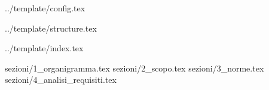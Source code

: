  {../template/config.tex}


\def\DOCUMENTO{Relazione}
\def\VERSIONE{1.0.0}

\def\DESCRIZIONE{<Info documento>}

\def\REDATTORE {Francesco Bizzaro\\ & Gino Zaidan}
\def\VERIFICATORE {Luca Finotello\\ & Stefano Scaglione}
\def\RESPONSABILE {Bizzaro Francesco}

\def\USO {Interno}

\def\DISTRIBUZIONE {\GRUPPO{}\\ & \COMMITTENTE{}\\}

\def\DESCRIZIONE {Relazione del progetto \textit{\PROGETTO}, realizzato per il corso di \textit{tecnologie web} dal gruppo \GRUPPO}


\def\INDICE	{true}
\def\TABELLE {false}
\def\FIGURE {false}


 {../template/structure.tex}


 {../template/index.tex}

 {sezioni/1_organigramma.tex}
 {sezioni/2_scopo.tex}
 {sezioni/3_norme.tex}
 {sezioni/4_analisi_requisiti.tex}









